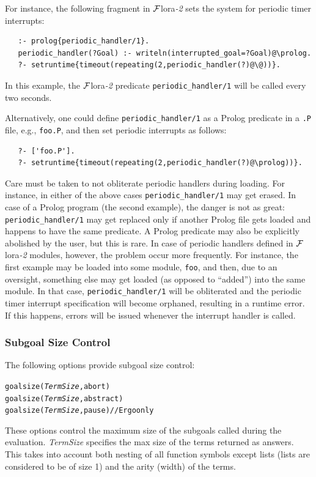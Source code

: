 \documentclass[11pt]{article}
\newcommand{\FLORA}{{\mbox{\sc ${\cal F}${lora}\rm\emph{-2}}}\xspace}
\newcommand{\FLSYSTEM}{\FLORA}
\begin{document}
For instance, the following fragment in \FLSYSTEM sets the system for periodic
timer interrupts:
\begin{verbatim}
   :- prolog{periodic_handler/1}.
   periodic_handler(?Goal) :- writeln(interrupted_goal=?Goal)@\prolog.
   ?- setruntime{timeout(repeating(2,periodic_handler(?)@\@))}.
\end{verbatim}
In this example, the \FLSYSTEM predicate \texttt{periodic\_handler/1} will be
called every two seconds. 

Alternatively, one could define \texttt{periodic\_handler/1} as a Prolog
predicate in a \texttt{.P} file,
e.g., \texttt{foo.P}, and then set
periodic interrupts as follows:  
\begin{verbatim}
   ?- ['foo.P'].
   ?- setruntime{timeout(repeating(2,periodic_handler(?)@\prolog))}.
\end{verbatim}

Care must be taken to not obliterate periodic handlers
during loading. For instance, in either of the above cases
\texttt{periodic\_handler/1} may get erased. In case of a Prolog program
(the second example), the danger is not as great:
\texttt{periodic\_handler/1} may get replaced only if another Prolog file gets
loaded and happens to have the same predicate. A Prolog predicate may also
be explicitly abolished by the user, but this is rare.
In case of periodic handlers defined in \FLSYSTEM
modules, however, the problem occur more frequently. For instance, the first example may
be loaded into some module, \texttt{foo}, and then, due to an oversight,
something else may get loaded (as opposed to ``added'') into the same module.
In that case, \texttt{periodic\_handler/1} will be obliterated and the
periodic timer interrupt specification
will become orphaned, resulting in a runtime error. If this happens, errors will
be issued whenever the interrupt handler is called.

\subsubsection{Subgoal Size Control}\label{sec-size-control}

The following options provide subgoal size control:
\begin{alltt}
    goalsize(\emph{TermSize},abort)
    goalsize(\emph{TermSize},abstract)
    goalsize(\emph{TermSize},pause)        \textnormal{// Ergo only}
\end{alltt}
These options control the maximum size of the subgoals called during the
evaluation. \emph{TermSize} specifies the max size of the terms returned as
answers. This takes into account both nesting of all function
symbols except lists (lists are considered to be of size 1) and the arity
(width) of the terms.
\end{document}

